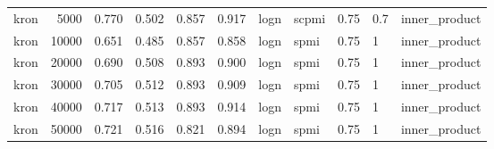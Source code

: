\begin{tabular}{lrrrrrlllll}
    kron &            5000 &  0.770 &  0.502 &      0.857 &          0.917 &  logn &  scpmi &    0.75 &  0.7 &  inner\_product \\
    kron &           10000 &  0.651 &  0.485 &      0.857 &          0.858 &  logn &   spmi &    0.75 &    1 &  inner\_product \\
    kron &           20000 &  0.690 &  0.508 &      0.893 &          0.900 &  logn &   spmi &    0.75 &    1 &  inner\_product \\
    kron &           30000 &  0.705 &  0.512 &      0.893 &          0.909 &  logn &   spmi &    0.75 &    1 &  inner\_product \\
    kron &           40000 &  0.717 &  0.513 &      0.893 &          0.914 &  logn &   spmi &    0.75 &    1 &  inner\_product \\
    kron &           50000 &  0.721 &  0.516 &      0.821 &          0.894 &  logn &   spmi &    0.75 &    1 &  inner\_product \\
\bottomrule
\end{tabular}
